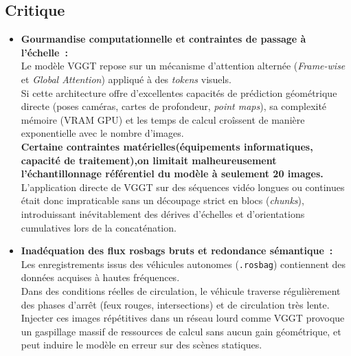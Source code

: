 \documentclass[12pt,a4paper,oneside]{report}
\begin{document}
\subsection{Critique}
\vspace{0.5cm}
\begin{itemize}
    \setlength{\itemsep}{1.5em}
    \renewcommand{\labelitemi}{{\large\bfseries\textbullet}}
    \item {\bfseries Gourmandise computationnelle et contraintes de passage à l'échelle~: \vspace{0.3cm}} \\ 
    \hspace*{1em}Le modèle VGGT repose sur un mécanisme d'attention alternée (\textit{Frame-wise} et \textit{Global Attention}) appliqué à des \textit{tokens} visuels.\\
    \hspace*{.8cm} Si cette architecture offre d'excellentes capacités de prédiction géométrique directe (poses caméras, cartes de profondeur, \textit{point maps}), sa complexité mémoire (VRAM GPU) et les temps de calcul croîssent de manière exponentielle avec le nombre d'images. \\

    \hspace*{1em}\textbf{Certaine contraintes matérielles(équipements informatiques, capacité de traitement),on limitait malheureusement l'échantillonnage référentiel du modèle à seulement 20 images.} \\

    \hspace*{1em}L'application directe de VGGT sur des séquences vidéo longues ou continues était donc impraticable sans un découpage strict en blocs (\textit{chunks}), introduissant inévitablement des dérives d'échelles et d'orientations cumulatives lors de la concaténation.
    
    \item {\bfseries Inadéquation des flux rosbags bruts et redondance sémantique~:  \vspace{0.3cm}}\\
    \hspace*{1em}Les enregistrements issus des véhicules autonomes (\texttt{.rosbag}) contiennent des données acquises à hautes fréquences. \\
    \hspace*{.8cm}Dans des conditions réelles de circulation, le véhicule traverse régulièrement des phases d'arrêt (feux rouges, intersections) et de circulation très lente.\\
    \hspace*{1em}Injecter ces images répétitives dans un réseau lourd comme VGGT provoque un gaspillage massif de ressources de calcul sans aucun gain géométrique, et peut induire le modèle en erreur sur des scènes statiques.
    

\end{itemize}
\end{document}
